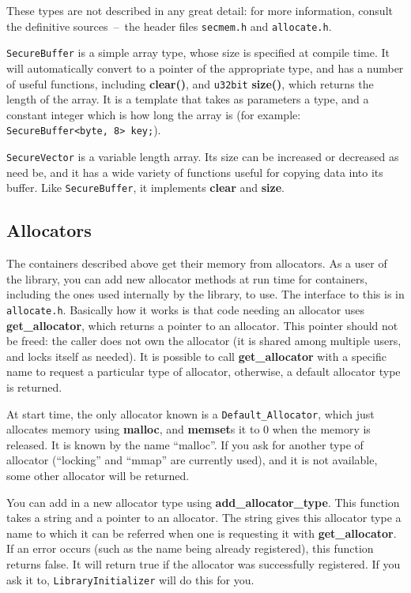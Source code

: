 \documentclass{article}
\newcommand{\filename}[1]{\texttt{#1}}
\newcommand{\function}[1]{\textbf{#1}}
\newcommand{\type}[1]{\texttt{#1}}
\begin{document}
These types are not described in any great detail: for more information,
consult the definitive sources~--~the header files \filename{secmem.h} and
\filename{allocate.h}.

\type{SecureBuffer} is a simple array type, whose size is specified at compile
time. It will automatically convert to a pointer of the appropriate type, and
has a number of useful functions, including \function{clear()}, and
\type{u32bit} \function{size()}, which returns the length of the array. It is a
template that takes as parameters a type, and a constant integer which is how
long the array is (for example: \verb|SecureBuffer<byte, 8> key;|).

\type{SecureVector} is a variable length array. Its size can be increased or
decreased as need be, and it has a wide variety of functions useful for copying
data into its buffer. Like \type{SecureBuffer}, it implements \function{clear}
and \function{size}.

\subsection{Allocators}

The containers described above get their memory from allocators. As a user of
the library, you can add new allocator methods at run time for containers,
including the ones used internally by the library, to use. The interface to
this is in \filename{allocate.h}. Basically how it works is that code needing
an allocator uses \function{get\_allocator}, which returns a pointer to an
allocator. This pointer should not be freed: the caller does not own the
allocator (it is shared among multiple users, and locks itself as needed). It
is possible to call \function{get\_allocator} with a specific name to request a
particular type of allocator, otherwise, a default allocator type is returned.

At start time, the only allocator known is a \type{Default\_Allocator}, which
just allocates memory using \function{malloc}, and \function{memset}s it to 0
when the memory is released. It is known by the name ``malloc''. If you ask for
another type of allocator (``locking'' and ``mmap'' are currently used), and it
is not available, some other allocator will be returned.

You can add in a new allocator type using \function{add\_allocator\_type}. This
function takes a string and a pointer to an allocator. The string gives this
allocator type a name to which it can be referred when one is requesting it
with \function{get\_allocator}. If an error occurs (such as the name being
already registered), this function returns false. It will return true if the
allocator was successfully registered. If you ask it to,
\type{LibraryInitializer} will do this for you.
\end{document}
